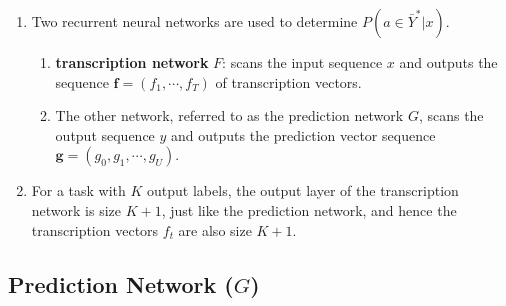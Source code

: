 \begin{enumerate}
    \item Two recurrent neural networks are used to determine $P(a \in \bar{Y}^\ast|x)$.
    \hfill \cite{arxiv/1211.3711/Sequence-Transduction-RNN}
    \begin{enumerate}
        \item \textbf{transcription network} $F$: scans the input sequence $x$ and outputs the sequence $\bm{f} = (f_1, \cdots , f_T )$ of transcription vectors.
        \hfill \cite{arxiv/1211.3711/Sequence-Transduction-RNN}

        \item The other network, referred to as the prediction network $G$, scans the output sequence $y$ and outputs the prediction vector sequence $\bm{g} = (g_0, g_1, \cdots , g_U )$.
        \hfill \cite{arxiv/1211.3711/Sequence-Transduction-RNN}
    \end{enumerate}

    \item  For a task with $K$ output labels, the output layer of the transcription network is size $K + 1$, just like the prediction network, and hence the transcription vectors $f_t$ are also size $K + 1$.
    \hfill \cite{arxiv/1211.3711/Sequence-Transduction-RNN}
\end{enumerate}


\subsection{Prediction Network ($G$)}

